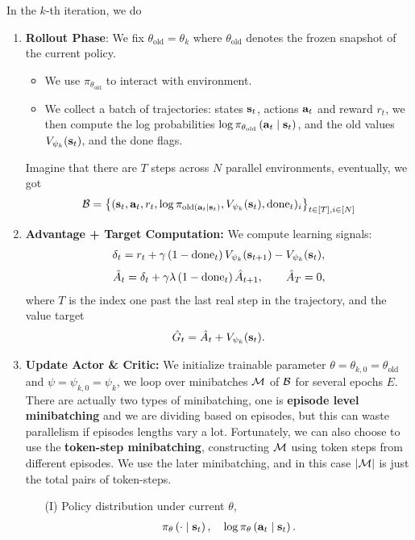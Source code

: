 \documentclass[11pt]{article}  %
\begin{document}
In the $k$-th iteration, we do 
\begin{enumerate}
  \item \textbf{Rollout Phase}: We fix $\theta_{\text{old}} = \theta_{k}$ where $\theta_{\text{old}}$ denotes the frozen snapshot of the current policy.
  \begin{itemize}
    \item We use $\pi_{\theta_{\text{old}}}$ to interact with environment.
    \item We collect a batch of trajectories: states $\mathbf{s}_t$, actions $\mathbf{a}_t$ and reward $r_t$, we then compute the log probabilities $\log \pi_{\theta_{\text{old}}}\left( \mathbf{a}_t \mid \mathbf{s}_t \right)$, and the old values $V_{\psi_k}(\mathbf{s}_t)$, and the done flags.
  \end{itemize} 
  Imagine that there are $T$ steps across $N$ parallel environments, eventually, we got 
  \begin{align*}
    \mathcal{B} = \left\{ (\mathbf{s}_t, \mathbf{a}_t, r_t, \log \pi_{\text{old}(\mathbf{a}_t \mid \mathbf{s}_t)}, V_{\psi_k}(\mathbf{s}_t), \text{done}_t)_i \right\}_{t \in [T], i \in [N]}
  \end{align*}

  \item \textbf{Advantage + Target Computation:} 
  We compute learning signals: 
  \begin{align*}
    \delta_t = r_t + \gamma\left( 1 - \text{done}_t \right)V_{\psi_k}(\mathbf{s}_{t+1}) - V_{\psi_k}(\mathbf{s}_t),
  \end{align*}
  \begin{align*}
    \hat{A}_t = \delta_t + \gamma\lambda\left( 1 - \text{done}_t \right)\hat{A}_{t+1}, \qquad \hat{A}_{T} = 0,
  \end{align*}
  where $T$ is the index one past the last real step in the trajectory, and the value target 
  \begin{align*}
    \hat{G}_t = \hat{A}_t + V_{\psi_k}(\mathbf{s}_t).
  \end{align*}

  \item \textbf{Update Actor \& Critic:} We initialize trainable parameter $\theta = \theta_{k, 0} = \theta_{\text{old}}$ and $\psi = \psi_{k, 0} = \psi_k$, we loop over minibatches $\mathcal{M}$ of $\mathcal{B}$ for several epochs $E$. 
  There are actually two types of minibatching, one is \textbf{episode level minibatching} and we are dividing based on episodes, but this can waste parallelism if episodes lengths vary a lot.
  Fortunately, we can also choose to use the \textbf{token-step minibatching}, constructing $\mathcal{M}$ using token steps from different episodes.
  We use the later minibatching, and in this case $\lvert\mathcal{M}\rvert$ is just the total pairs of token-steps.
  \begin{enumerate}
    \item[(I)] Policy distribution under current $\theta$, 
    \begin{align*}
      \pi_{\theta}\left( \cdot \mid \mathbf{s}_t \right), \quad \log\pi_{\theta}\left( \mathbf{a}_t \mid \mathbf{s}_t \right).
    \end{align*} 
    

\end{enumerate}
\end{enumerate}
\end{document}
